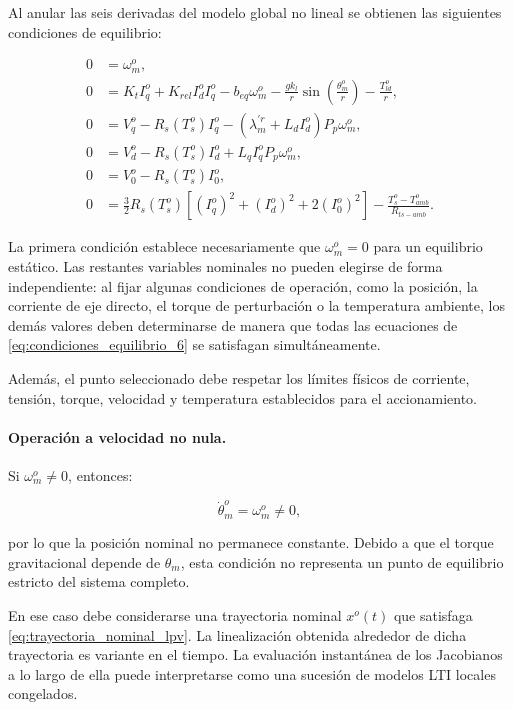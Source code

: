 \documentclass[10pt,a4paper]{article}
\begin{document}
Al anular las seis derivadas del modelo global no lineal se obtienen las siguientes condiciones de equilibrio:

\begin{equation}
	\boxed{
		\begin{aligned}
			0 &= \omega_m^o,\\[1mm]
			0 &= K_t I_q^o
			+K_{rel}I_d^oI_q^o
			-b_{eq}\omega_m^o
			-\frac{gk_l}{r}
			\sin\left(\frac{\theta_m^o}{r}\right)
			-\frac{T_{ld}^o}{r},\\[1mm]
			0 &= V_q^o
			-R_s(T_s^o)I_q^o
			-\left(\lambda_m^{\prime r}+L_dI_d^o\right)
			P_p\omega_m^o,\\[1mm]
			0 &= V_d^o
			-R_s(T_s^o)I_d^o
			+L_qI_q^oP_p\omega_m^o,\\[1mm]
			0 &= V_0^o-R_s(T_s^o)I_0^o,\\[1mm]
			0 &= \frac{3}{2}R_s(T_s^o)
			\left[
			(I_q^o)^2+(I_d^o)^2+2(I_0^o)^2
			\right]
			-\frac{T_s^o-T_{amb}^o}{R_{ts-amb}}.
		\end{aligned}
	}
	\label{eq:condiciones_equilibrio_6}
\end{equation}

La primera condición establece necesariamente que $\omega_m^o=0$ para un equilibrio estático. Las restantes variables nominales no pueden elegirse de forma independiente: al fijar algunas condiciones de operación, como la posición, la corriente de eje directo, el torque de perturbación o la temperatura ambiente, los demás valores deben determinarse de manera que todas las ecuaciones de \eqref{eq:condiciones_equilibrio_6} se satisfagan simultáneamente.

Además, el punto seleccionado debe respetar los límites físicos de corriente, tensión, torque, velocidad y temperatura establecidos para el accionamiento.

\paragraph{Operación a velocidad no nula.}
Si $\omega_m^o\neq0$, entonces:

\begin{equation}
	\dot{\theta}_m^o=\omega_m^o\neq0,
\end{equation}

por lo que la posición nominal no permanece constante. Debido a que el torque gravitacional depende de $\theta_m$, esta condición no representa un punto de equilibrio estricto del sistema completo.

En ese caso debe considerarse una trayectoria nominal $x^o(t)$ que satisfaga \eqref{eq:trayectoria_nominal_lpv}. La linealización obtenida alrededor de dicha trayectoria es variante en el tiempo. La evaluación instantánea de los Jacobianos a lo largo de ella puede interpretarse como una sucesión de modelos LTI locales congelados.
\end{document}
